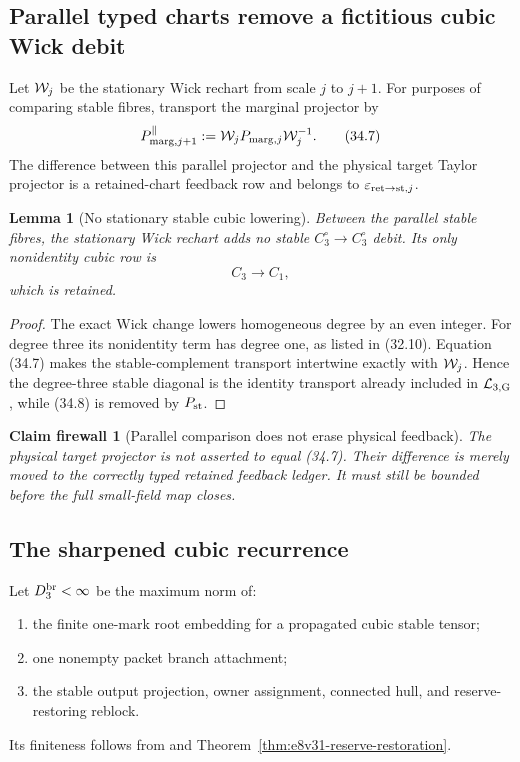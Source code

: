 \documentclass[11pt,oneside]{book}
\newtheorem{lemma}[theorem]{Lemma}
\newtheorem{firewall}[theorem]{Claim firewall}
\theoremstyle{definition}
\theoremstyle{remark}
\begin{document}
\subsection{Parallel typed charts remove a fictitious cubic Wick debit}

Let \({\cal W}_j\) be the stationary Wick rechart from scale \(j\) to
\(j+1\).  For purposes of comparing stable fibres, transport the
marginal projector by
\[
 P_{{\rm marg},j+1}^{\parallel}
 :=
 {\cal W}_jP_{{\rm marg},j}{\cal W}_j^{-1}.                       \tag{34.7}
\]
The difference between this parallel projector and the physical
target Taylor projector is a retained-chart feedback row and belongs
to \(\varepsilon_{{\rm ret}\to{\rm st},j}\).

\begin{lemma}[No stationary stable cubic lowering]
\label{lem:e8v34-no-cubic-Wick}
Between the parallel stable fibres, the stationary Wick rechart adds
no stable \(C_3^\circ\to C_3^\circ\) debit.  Its only nonidentity
cubic row is
\[
                         C_3\longrightarrow C_1,                 \tag{34.8}
\]
which is retained.
\end{lemma}

\begin{proof}
The exact Wick change lowers homogeneous degree by an even integer.
For degree three its nonidentity term has degree one, as listed in
(32.10).  Equation (34.7) makes the stable-complement transport
intertwine exactly with \({\cal W}_j\).  Hence the degree-three
stable diagonal is the identity transport already included in
\({\cal L}_{3,{\rm G}}\), while (34.8) is removed by
\(P_{\rm st}\).
\end{proof}

\begin{firewall}[Parallel comparison does not erase physical
feedback]
\label{fire:e8v34-parallel}
The physical target projector is not asserted to equal (34.7).
Their difference is merely moved to the correctly typed retained
feedback ledger.  It must still be bounded before the full
small-field map closes.
\end{firewall}

\subsection{The sharpened cubic recurrence}

Let \(D_3^{\rm br}<\infty\) be the maximum norm of:
\begin{enumerate}
\item the finite one-mark root embedding for a propagated cubic
      stable tensor;
\item one nonempty packet branch attachment;
\item the stable output projection, owner assignment, connected
      hull, and reserve-restoring reblock.
\end{enumerate}
Its finiteness follows from
 and
Theorem~\ref{thm:e8v31-reserve-restoration}.
\end{document}
